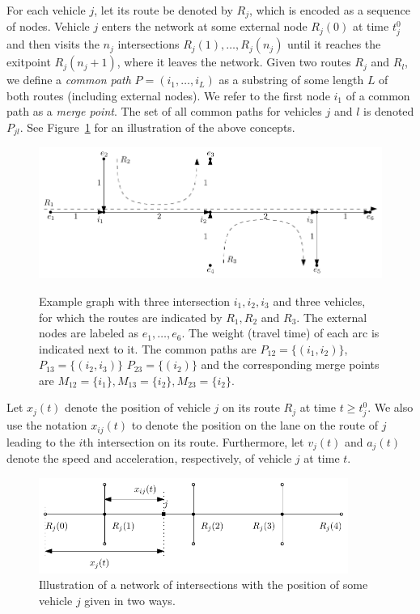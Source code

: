\documentclass{article}
\theoremstyle{definition}
\theoremstyle{plain}
\begin{document}
For each vehicle $j$, let its route be denoted by $R_{j}$, which is encoded as a
sequence of nodes. Vehicle $j$ enters the network at some external node
$R_{j}(0)$ at time $t^{0}_{j}$ and then visits the $n_{j}$ intersections
$R_{j}(1), \dots, R_{j}(n_{j})$ until it reaches the exitpoint
$R_{j}(n_{j} + 1)$, where it leaves the network.
Given two routes $R_{j}$ and $R_{l}$, we define a \textit{common path}
$P=(i_{1},\dots,i_{L})$ as a substring of some length $L$ of both routes
(including external nodes). We refer to the first node $i_{1}$ of a common path
as a \textit{merge point}. The set of all common paths for vehicles $j$ and $l$
is denoted $P_{jl}$. See Figure~\ref{fig:intersection-graph-example} for an
illustration of the above concepts.

\begin{figure}[t]
  \centering
  \includegraphics[width=1.0\textwidth]{figures/intersection-graph-example.pdf}
  \label{fig:intersection-graph-example}
  \caption{Example graph with three intersection $i_{1}, i_{2}, i_{3}$ and three
    vehicles, for which the routes are indicated by $R_{1}, R_{2}$ and $R_{3}$.
    The external nodes are labeled as $e_{1}, \dots, e_{6}$. The weight
    (travel time) of each arc is indicated next to it. The common paths are
    $P_{12} = \{ (i_{1}, i_{2}) \}$, $P_{13} = \{ (i_{2}, i_{3}) \}$
    $P_{23} = \{ (i_{2}) \}$ and the corresponding merge points are
    $M_{12} = \{ i_{1} \}, M_{13} = \{ i_{2} \}, M_{23} = \{ i_{2} \}$.}
\end{figure}

Let $x_{j}(t)$ denote the position of vehicle $j$ on its route $R_{j}$ at time
$t \geq t_{j}^{0}$. We also use the notation $x_{ij}(t)$ to denote the position
on the lane on the route of $j$ leading to the $i$th intersection on its route.
Furthermore, let $v_{j}(t)$ and $a_{j}(t)$ denote the speed and acceleration,
respectively, of vehicle $j$ at time $t$.

\begin{figure}[b]
  \centering
  \includegraphics[width=0.9\textwidth]{figures/general_traffic_model.pdf}
  \caption{Illustration of a network of intersections with the position of some
    vehicle $j$ given in two ways.}
  \label{fig:general-model}
\end{figure}
\end{document}
